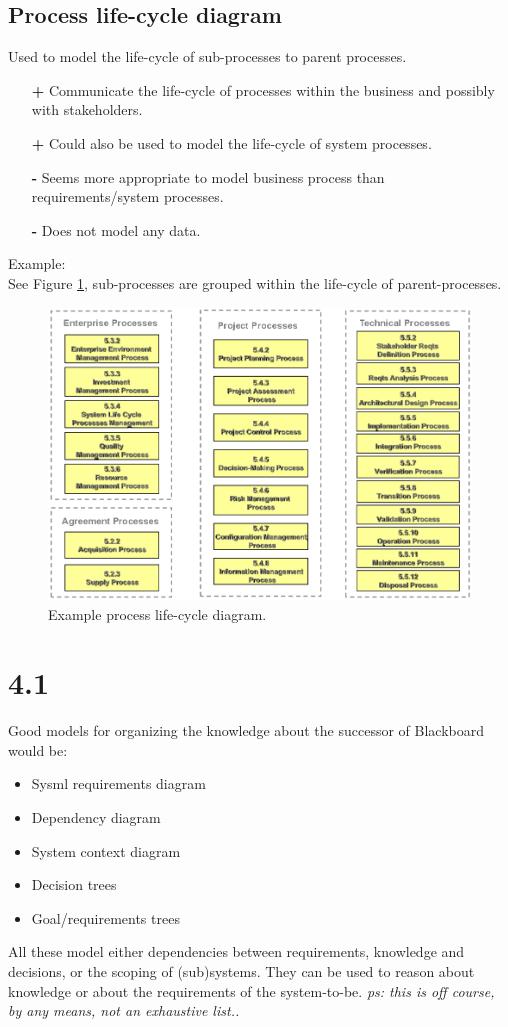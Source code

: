 \clearpage
\subsection*{Process life-cycle diagram \cite{sysml}}
Used to model the life-cycle of sub-processes to parent processes.
\begin{itemize}
	\item[\textbf{+}] Communicate the life-cycle of processes within the business and possibly with stakeholders.
	\item[\textbf{+}] Could also be used to model the life-cycle of system processes.
	\item[\textbf{-}] Seems more appropriate to model business process than requirements/system processes.
	\item[\textbf{-}] Does not model any data.
\end{itemize}

Example:\\
See Figure \ref{fig:lifecycle_diagram}, sub-processes are grouped within the life-cycle of parent-processes.
\begin{figure}[h]
	\centering
	\includegraphics[width=1\linewidth]{Resources/4_lifecycle_diagram.png}
	\caption{Example process life-cycle diagram.}
	\label{fig:lifecycle_diagram}
\end{figure} 


\clearpage
\section*{4.1}
Good models for organizing the knowledge about the successor of Blackboard would be:
\begin{itemize}
	\item Sysml requirements diagram
	\item Dependency diagram
	\item System context diagram
	\item Decision trees
	\item Goal/requirements trees
\end{itemize}
All these model either dependencies between requirements, knowledge and decisions, or the scoping of (sub)systems. They can be used to reason about knowledge or about the requirements of the system-to-be. \emph{ps: this is off course, by any means, not an exhaustive list..}


